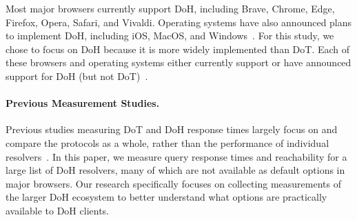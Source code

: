 Most major browsers currently support DoH, including Brave, Chrome, Edge,
Firefox, Opera, Safari, and Vivaldi.  Operating systems have also announced
plans to implement DoH, including iOS, MacOS, and
Windows~\cite{ffSettings,operaEdgeSettings,vivaldiSettings,iosSettings,jensen2020windows}.
For this study, we chose to focus on DoH because it is more widely implemented
than DoT.  Each of these browsers and operating systems either
currently support or have announced support for DoH (but not
DoT)~\cite{lack-of-dot-support}.

\paragraph{Previous Measurement Studies.}
Previous studies measuring DoT and DoH response times largely
focus on and compare the protocols as a whole, rather than the performance of
individual resolvers~\cite{lu2019end-to-end}.  
In this paper, we measure query response times and reachability for a large
list of DoH resolvers, many of which are not available as default options in
major browsers. 
Our research specifically
focuses on collecting measurements of the larger DoH ecosystem to better
understand what options are practically available to DoH clients.

